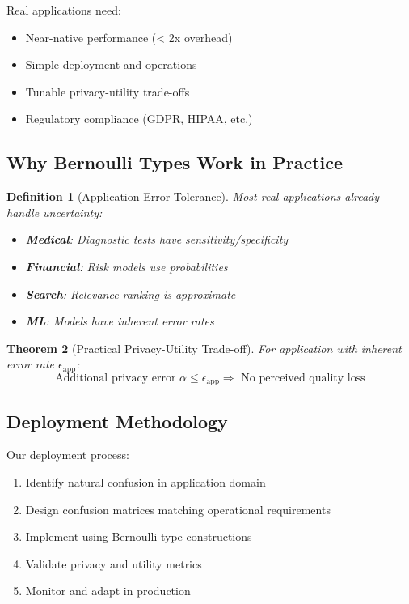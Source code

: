 \documentclass[11pt,final]{article}
\newtheorem{theorem}{Theorem}[section]
\newtheorem{definition}[theorem]{Definition}
\begin{document}
Real applications need:
\begin{itemize}
    \item Near-native performance (< 2x overhead)
    \item Simple deployment and operations
    \item Tunable privacy-utility trade-offs
    \item Regulatory compliance (GDPR, HIPAA, etc.)
\end{itemize}

\subsection{Why Bernoulli Types Work in Practice}

\begin{definition}[Application Error Tolerance]
Most real applications already handle uncertainty:
\begin{itemize}
    \item \textbf{Medical}: Diagnostic tests have sensitivity/specificity
    \item \textbf{Financial}: Risk models use probabilities
    \item \textbf{Search}: Relevance ranking is approximate
    \item \textbf{ML}: Models have inherent error rates
\end{itemize}
\end{definition}

\begin{theorem}[Practical Privacy-Utility Trade-off]
For application with inherent error rate $\epsilon_{\text{app}}$:
\begin{equation}
\text{Additional privacy error } \alpha \leq \epsilon_{\text{app}} \Rightarrow \text{ No perceived quality loss}
\end{equation}
\end{theorem}

\subsection{Deployment Methodology}

Our deployment process:
\begin{enumerate}
    \item Identify natural confusion in application domain
    \item Design confusion matrices matching operational requirements
    \item Implement using Bernoulli type constructions
    \item Validate privacy and utility metrics
    \item Monitor and adapt in production
\end{enumerate}
\end{document}
